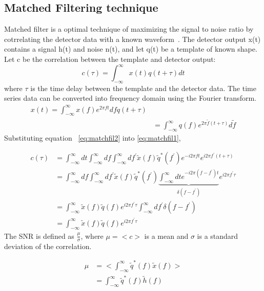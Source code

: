 \documentclass{ttuthes2007}
\begin{document}
\subsection{Matched Filtering technique}
Matched filter is a optimal technique of maximizing the signal to noise ratio by
cotrrelating the detector data with a known waveform~\cite{Sathyaprakash_2009}.
The detector output x(t) contains a signal h(t) and noise n(t), and let q(t) be
a template of known shape. Let c be the correlation between the template and
detector output:
\begin{equation}\label{eq:matchfil1}
c(\tau) = \int_{-\infty}^{\infty} x(t)q(t+\tau)dt
\end{equation}
where $\tau$ is the time delay between the template and the detector data.
The time series data can be converted into frequency domain using the Fourier
transform. 
\begin{equation}\label{eq:matchfil2}
\begin{split}
x(t)=\int_{-\infty}^{\infty} x(f)e^{2\pi f t} df
q(t+\tau)\\
&=\int_{-\infty}^{\infty} q(f)e^{2\pi\tilde{f}(t+\tau)} d\tilde{f}
\end{split}
\end{equation}
Substituting equation ~\ref{eq:matchfil2} into \ref{eq:matchfil1},

\begin{align*}
c(\tau) &= \int_{-\infty}^{\infty} dt \int_{-\infty}^{\infty}
df\int_{-\infty}^{\infty} df^{'} \tilde{x}(f)\tilde{q}^*(f^{'}) e^{-i2\pi
ft}e^{i2\pi f^{'}(t+\tau)}\\
  & = \int_{-\infty}^{\infty} df \int_{-\infty}^{\infty} df^{'}
\tilde{x}(f)\tilde{q}^*(f^{'})\underbrace{\int_{-\infty}^{\infty} dt e^{-i 2\pi
(f-f^{'})t}}_{\delta(f-f^{'})}
e^{i 2\pi f^{'}\tau}\\
 & = \int_{-\infty}^{\infty}\tilde{x}(f)\tilde{q}(f)e^{i 2\pi f^{'}\tau}
\int_{-\infty}^{\infty} df^{'}\delta(f-f^{'})\\
 & = \int_{-\infty}^{\infty}\tilde{x}(f)\tilde{q}(f)e^{i 2\pi f^{'}\tau}
\end{align*}
The \ac{SNR} is defined as $\frac{\mu}{\sigma}$, where $\mu=<c>$ is a mean and
$\sigma$ is a standard deviation of the correlation.

\begin{align*}\label{eq:sign}
\mu & = <\int_{-\infty}^{\infty}\tilde{q}^{*}(f)\tilde{x}(f)>\\
&=\int_{-\infty}^{\infty}\tilde{q}^{*}(f)\tilde{h}(f)
\end{align*}
\end{document}
